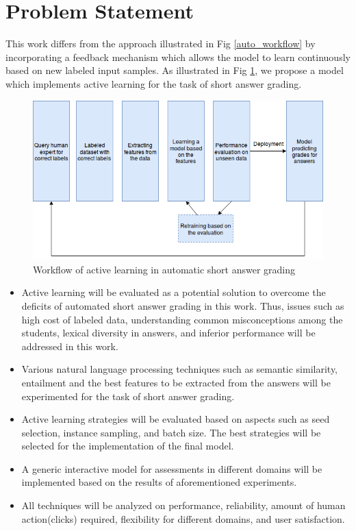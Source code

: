 \section{Problem Statement}

This work differs from the approach illustrated in Fig \ref{auto_workflow} by incorporating a feedback mechanism which allows the model to learn continuously based on new labeled input samples. As illustrated in Fig \ref{ac_simple_workflow}, we propose a model which implements active learning for the task of short answer grading.

\vspace{5mm}

\begin{figure}[h]
	\centering
	\includegraphics[scale=0.6]{images/simpler_model_ac}
	\caption{Workflow of active learning in automatic short answer grading} %
	\label{ac_simple_workflow}
\end{figure}

\begin{itemize}
\vspace{3mm}
	\item Active learning will be evaluated as a potential solution to overcome the deficits of automated short answer grading in this work. Thus, issues such as high cost of labeled data, understanding common misconceptions among the students, lexical diversity in answers, and inferior performance will be addressed in this work.   
	\item Various natural language processing techniques such as semantic similarity, entailment and the best features to be extracted from the answers will be experimented for the task of short answer grading. 
	\item Active learning strategies will be evaluated based on aspects such as seed selection, instance sampling, and batch size. The best strategies will be selected for the implementation of the final model.
	\item A generic interactive model for assessments in different domains will be implemented based on the results of aforementioned experiments.
	\item All techniques will be analyzed on performance, reliability, amount of human action(clicks) required, flexibility for different domains, and user satisfaction.  
\end{itemize} 